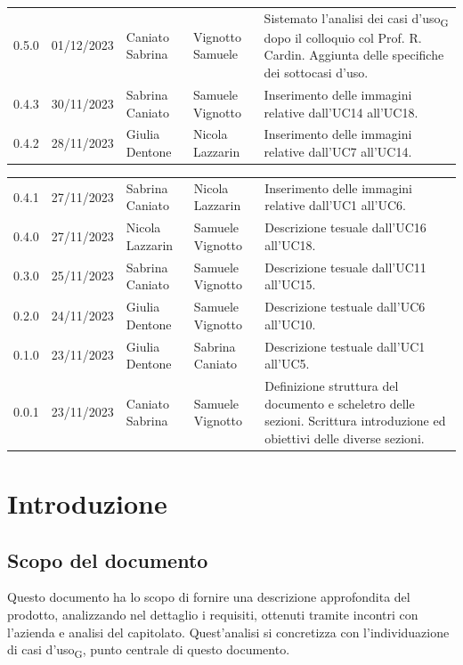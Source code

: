\documentclass{article}
\begin{document}
\begin{center}
\begin{tabular}{P{4em} P{6em} P{7em} P{7em} P{11em}}
    0.5.0 & 01/12/2023 & Caniato Sabrina & Vignotto Samuele & Sistemato l'analisi dei casi d'uso\textsubscript{G} dopo il colloquio col Prof. R. Cardin. Aggiunta delle specifiche dei sottocasi d'uso.\\
    0.4.3 & 30/11/2023 & Sabrina Caniato & Samuele Vignotto & Inserimento delle immagini relative dall'UC14 all'UC18.\\
    0.4.2 & 28/11/2023 & Giulia Dentone & Nicola Lazzarin & Inserimento delle immagini relative dall'UC7 all'UC14.\\
    \end{tabular}


\begin{tabular}{P{4em} P{6em} P{7em} P{7em} P{11em}} 
    0.4.1 & 27/11/2023 & Sabrina Caniato & Nicola Lazzarin & Inserimento delle immagini relative dall'UC1 all'UC6.\\
    0.4.0 & 27/11/2023 & Nicola Lazzarin & Samuele Vignotto & Descrizione tesuale dall'UC16 all'UC18. \\
    0.3.0 & 25/11/2023 & Sabrina Caniato & Samuele Vignotto & Descrizione tesuale dall'UC11 all'UC15. \\
    0.2.0 & 24/11/2023 & Giulia Dentone & Samuele Vignotto & Descrizione testuale dall'UC6 all'UC10.\\ 
    0.1.0 & 23/11/2023 & Giulia Dentone & Sabrina Caniato & Descrizione testuale dall'UC1 all'UC5.\\
    0.0.1 & 23/11/2023 & Caniato Sabrina  & Samuele Vignotto & Definizione struttura del documento e scheletro delle sezioni. Scrittura introduzione ed obiettivi delle diverse sezioni.\\ 
\end{tabular}
\end{center}
\newpage
\tableofcontents
\listoffigures
\listoftables
\newpage
\section*{Introduzione}

\subsection*{Scopo del documento}

Questo documento ha lo scopo di fornire una descrizione approfondita del prodotto, analizzando nel dettaglio i requisiti, ottenuti tramite incontri con l'azienda e analisi del capitolato. Quest'analisi si concretizza con l'individuazione di casi d'uso\textsubscript{G}, punto centrale di questo documento.
\end{document}

